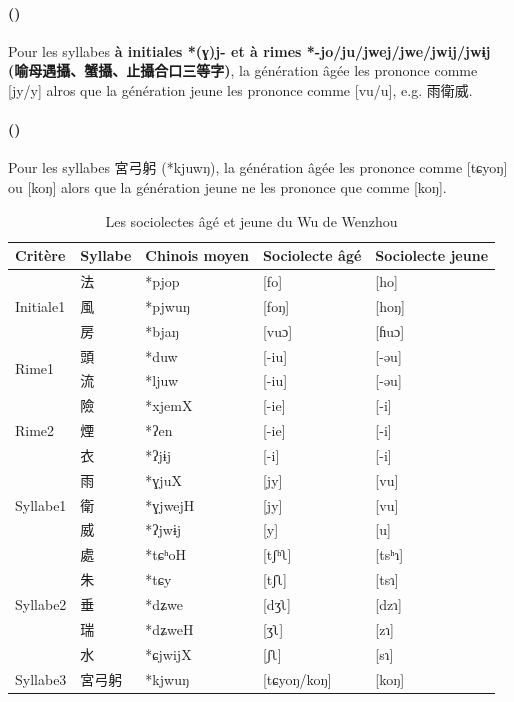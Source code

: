 \documentclass{scrbook}
\newcounter{c}[subsubsection]
\newcommand{\stpc}[1]{\stepcounter{#1}}
\newcommand{\diflaoxin}{sociolectes âgé et jeune\xspace}
\newcommand{\termyyx}[1]{\textbf{#1}}
\begin{document}
\begin{sloppypar}
\stpc{c}\paragraph{()}
Pour les syllabes \termyyx{à initiales *(ɣ)j- et à rimes *-jo/ju/jwej/jwe/jwij/jwɨj (喻母遇攝、蟹攝、止攝合口三等字)}, la génération âgée les prononce comme [jy/y] alros que la génération jeune les prononce comme [vu/u], e.g. 雨衛威. 

\stpc{c}\paragraph{()}
Pour les syllabes 宮弓躬 (*kjuwŋ), la génération âgée les prononce comme [tɕyoŋ] ou [koŋ] alors que la génération jeune ne les prononce que comme [koŋ]. 

\begin{table}[htbp]
  \centering
    \begin{tabular}{lllll}
    \toprule
    Critère & Syllabe & Chinois moyen  & Sociolecte âgé & Sociolecte jeune \\
    \midrule
    \multirow{3}[2]{*}{Initiale1} & 法     & *pjop & [fo]  & [ho] \\
          & 風     & *pjwuŋ & [foŋ] & [hoŋ] \\
          & 房     & *bjaŋ & [vuɔ] & [ɦuɔ] \\
    \midrule
    \multirow{2}[2]{*}{Rime1} & 頭     & *duw  & [-iu] & [-əu] \\
          & 流     & *ljuw & [-iu] & [-əu] \\
    \midrule
    \multirow{3}[2]{*}{Rime2} & 險     & *xjemX & [-ie] & [-i] \\
          & 煙     & *ʔen  & [-ie] & [-i] \\
          & 衣     & *ʔjɨj & [-i]  & [-i] \\
    \midrule
    \multirow{3}[2]{*}{Syllabe1} & 雨     & *ɣjuX & [jy]  & [vu] \\
          & 衛     & *ɣjwejH & [jy]  & [vu] \\
          & 威     & *ʔjwɨj & [y]   & [u] \\
    \midrule
    \multirow{5}[2]{*}{Syllabe2} & 處     & *tɕʰoH & [tʃʰʅ] & [tsʰɿ] \\
          & 朱     & *tɕy  & [tʃʅ] & [tsɿ] \\
          & 垂     & *dʑwe & [dʒʅ] & [dzɿ] \\
          & 瑞     & *dʑweH & [ʒʅ]  & [zɿ] \\
          & 水     & *ɕjwijX & [ʃʅ]  & [sɿ] \\
    \midrule
    Syllabe3 & 宮弓躬   & *kjwuŋ & [tɕyoŋ/koŋ] & [koŋ] \\
    \bottomrule
    \end{tabular}%
  \caption{Les \diflaoxin du Wu de Wenzhou}
  \label{tab:Wenzhou2}%
\end{table}%


\end{sloppypar}
\end{document}
